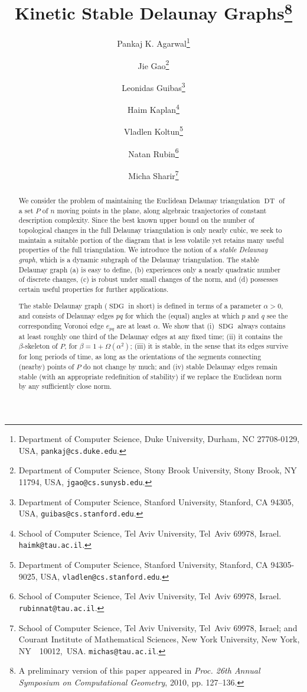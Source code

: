 \documentclass[letter,11pt]{article}
\def\SDG{\mathop{\mathrm{SDG}}}
\def\DT{\mathop{\mathrm{DT}}}
\begin{document}
\begin{titlepage}

\title{Kinetic Stable Delaunay Graphs\thanks{A preliminary version of this paper appeared in {\it Proc. 26th Annual Symposium on Computational Geometry}, 2010, pp. 127--136.}}

\author{Pankaj K. Agarwal\thanks{Department of Computer Science, Duke University, Durham, NC
    27708-0129, USA, {\tt pankaj@cs.duke.edu}.}
\and
Jie Gao\thanks{Department of Computer Science, Stony Brook University, Stony
Brook, NY 11794, USA, {\tt jgao@cs.sunysb.edu}. }
\and
Leonidas Guibas\thanks{Department of Computer Science, Stanford University, Stanford,
CA 94305, USA, {\tt guibas@cs.stanford.edu}.}
\and
Haim Kaplan\thanks{School of Computer Science, Tel Aviv University, Tel~Aviv 69978, Israel.
{\tt haimk@tau.ac.il}.}
\and
Vladlen Koltun\thanks{Department of Computer Science, Stanford University, Stanford,
CA 94305-9025, USA, {\tt vladlen@cs.stanford.edu}.}
\and
Natan Rubin\thanks{School of Computer Science, Tel Aviv University, Tel~Aviv 69978, Israel.
{\tt rubinnat@tau.ac.il}.}
\and
Micha Sharir\thanks{School of Computer Science, Tel Aviv University, Tel~Aviv 69978, Israel;
and Courant Institute of Mathematical Sciences, New York University,
New York, NY~~10012,~USA.  {\tt michas@tau.ac.il}.}
}

\maketitle


\begin{abstract}
We consider the problem of maintaining the Euclidean Delaunay
triangulation $\DT$ of a set $P$ of $n$ moving points in the plane, along algebraic tranjectories of constant description complexity.
Since the best known upper bound on the number of topological changes 
in the full Delaunay triangulation is only nearly cubic, we seek 
to maintain a suitable portion of the diagram that is less volatile 
yet retains many useful properties of the full triangulation.  
We introduce the notion of a {\em stable Delaunay graph}, which is 
a dynamic subgraph of the Delaunay triangulation. The stable Delaunay graph (a) is easy to
define, (b) experiences only a nearly quadratic number of discrete 
changes, (c) is robust under small changes of the norm, and (d)
possesses certain useful properties for further applications.

The stable Delaunay graph ($\SDG$ in short) is defined in terms of
a parameter $\alpha>0$, and consists of Delaunay edges $pq$ for
which the (equal) angles at which $p$ and $q$ see the corresponding
Voronoi edge $e_{pq}$ are at least $\alpha$.
We show that (i) $\SDG$ always contains at least roughly one third of the
Delaunay edges at any fixed time; (ii) it contains the
$\beta$-skeleton of $P$, for $\beta=1+\Omega(\alpha^2)$; (iii) it is
stable, in the sense that its edges survive for long periods of time,
as long as the orientations of the segments connecting (nearby) points
of $P$ do not change by much; and (iv) stable Delaunay edges remain
stable (with an appropriate redefinition of stability) if we
replace the Euclidean norm by any sufficiently close norm.


\end{abstract}
\end{titlepage}
\end{document}
